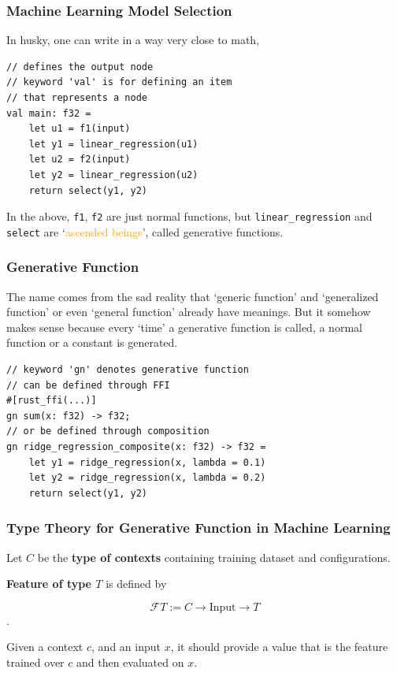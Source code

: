 \documentclass{beamer}   	%
\theoremstyle{definition}
\newcommand{\husky}[1]{\texttt{#1}}
\begin{document}
\begin{frame}[fragile]
\frametitle{Machine Learning Model Selection}

In husky, one can write in a way very close to math,
\begin{verbatim}
// defines the output node
// keyword 'val' is for defining an item
// that represents a node
val main: f32 =
	let u1 = f1(input)
	let y1 = linear_regression(u1)
	let u2 = f2(input)
	let y2 = linear_regression(u2)
	return select(y1, y2)
\end{verbatim}

In the above, \husky{f1}, \husky{f2} are just normal functions, but \husky{linear_regression} and \husky{select} are `\textcolor{orange}{ascended beings}', called generative functions.
	
\end{frame}

\begin{frame}[fragile]
\frametitle{Generative Function}

The name comes from the sad reality that `generic function' and `generalized function' or even `general function' already have meanings. But it somehow makes sense because every `time' a generative function is called, a normal function or a constant is generated.

\begin{verbatim}
// keyword 'gn' denotes generative function
// can be defined through FFI
#[rust_ffi(...)]
gn sum(x: f32) -> f32;
// or be defined through composition
gn ridge_regression_composite(x: f32) -> f32 =
	let y1 = ridge_regression(x, lambda = 0.1)
	let y2 = ridge_regression(x, lambda = 0.2)
	return select(y1, y2)
\end{verbatim}
	
\end{frame}

\begin{frame}
\frametitle{Type Theory for Generative Function in Machine Learning}

Let $C$ be the \textbf{type of contexts} containing training dataset and configurations.

\textbf{Feature of type $T$} is defined by

$$\mathscr{F}T:= C\to \text{Input} \to T$$.

Given a context $c$, and an input $x$, it should provide a value that is the feature trained over $c$ and then evaluated on $x$.
\end{frame}
\end{document}

